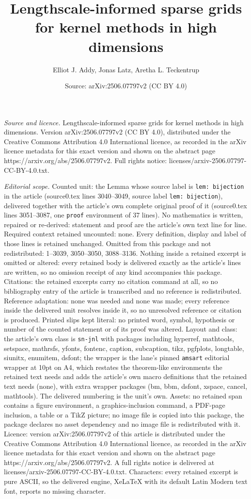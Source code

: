 \documentclass[10pt,a4paper]{amsart}
\title[Lengthscale-informed sparse grids for kernel methods in high]{Lengthscale-informed sparse grids for kernel methods in high dimensions}
\author{Elliot J. Addy, Jonas Latz, Aretha L. Teckentrup}
\date{Source: arXiv:2506.07797v2 (CC BY 4.0)}
\begin{document}
\maketitle

\noindent\emph{Source and licence.} Lengthscale-informed sparse grids for kernel methods in high dimensions. Version arXiv:2506.07797v2 (CC BY 4.0), distributed under the Creative Commons Attribution 4.0 International licence, as recorded in the arXiv licence metadata for this exact version and shown on the abstract page https://arxiv.org/abs/2506.07797v2. Full rights notice: licenses/arxiv-2506.07797-CC-BY-4.0.txt.\par\smallskip

\noindent\textit{Editorial scope.} Counted unit: the Lemma whose source label is \texttt{lem: bijection} in the article (source0.tex lines 3040--3049, source label \texttt{lem: bijection}), delivered together with the article's own complete original proof of it (source0.tex lines 3051--3087, one \texttt{proof} environment of 37 lines). No mathematics is written, repaired or re-derived: statement and proof are the article's own text line for line. Required context retained uncounted: none. Every definition, display and label of those lines is retained unchanged. Omitted from this package and not redistributed: 1--3039, 3050--3050, 3088--3136. Nothing inside a retained excerpt is omitted or altered: every retained body is delivered exactly as the article's lines are written, so no omission receipt of any kind accompanies this package. Citations: the retained excerpts carry no citation command at all, so no bibliography entry of the article is transcribed and no reference is redistributed. Reference adaptation: none was needed and none was made; every reference inside the delivered unit resolves inside it, so no unresolved reference or citation is produced. Printed slips kept literal: no printed word, symbol, hypothesis or number of the counted statement or of its proof was altered. Layout and class: the article's own class is \texttt{sn-jnl} with packages including hyperref, mathtools, setspace, mathrsfs, yfonts, fontenc, caption, subcaption, tikz, pgfplots, longtable, siunitx, enumitem, dsfont; the wrapper is the lane's pinned \texttt{amsart} editorial wrapper at 10pt on A4, which restates the theorem-like environments the retained text needs and adds the article's own macro definitions that the retained text needs (none), with extra wrapper packages (bm, bbm, dsfont, xspace, cancel, mathtools). The delivered numbering is the unit's own. Assets: no retained span contains a figure environment, a graphics-inclusion command, a PDF-page inclusion, a table or a TikZ picture; no image file is copied into this package, the package declares no asset dependency and no image file is redistributed with it. Licence: version arXiv:2506.07797v2 of this article is distributed under the Creative Commons Attribution 4.0 International licence, as recorded in the arXiv licence metadata for this exact version and shown on the abstract page https://arxiv.org/abs/2506.07797v2. A full rights notice is delivered at licenses/arxiv-2506.07797-CC-BY-4.0.txt. Characters: every retained excerpt is pure ASCII, so the delivered engine, XeLaTeX with its default Latin Modern text font, reports no missing character.
\end{document}
